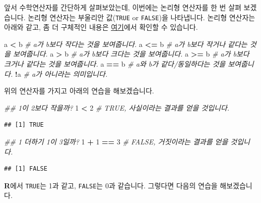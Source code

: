 \documentclass[]{book}
\newenvironment{Shaded}{\begin{snugshade}}{\end{snugshade}}
\newcommand{\CommentTok}[1]{\textcolor[rgb]{0.56,0.35,0.01}{\textit{#1}}}
\newcommand{\DecValTok}[1]{\textcolor[rgb]{0.00,0.00,0.81}{#1}}
\newcommand{\NormalTok}[1]{#1}
\newcommand{\OperatorTok}[1]{\textcolor[rgb]{0.81,0.36,0.00}{\textbf{#1}}}
\newcommand{\StringTok}[1]{\textcolor[rgb]{0.31,0.60,0.02}{#1}}
\begin{document}
앞서 수학연산자를 간단하게 살펴보았는데, 이번에는 논리형 연산자를 한 번 살펴 보겠습니다. 논리형 연산자는 부울리안 값(\texttt{TRUE} or \texttt{FALSE})을 나타냅니다. 논리형 연산자는 아래와 같고, 좀 더 구체적인 내용은 \href{https://www.statmethods.net/management/operators.html}{여기}에서 확인할 수 있습니다.

\begin{Shaded}
\begin{Highlighting}[]
\NormalTok{a }\OperatorTok{<}\StringTok{ }\NormalTok{b   }\CommentTok{# a가 b보다 작다는 것을 보여줍니다.}
\NormalTok{a }\OperatorTok{<=}\StringTok{ }\NormalTok{b  }\CommentTok{# a가 b보다 작거나 같다는 것을 보여줍니다.}
\NormalTok{a }\OperatorTok{>}\StringTok{ }\NormalTok{b   }\CommentTok{# a가 b보다 크다는 것을 보여줍니다.}
\NormalTok{a }\OperatorTok{>=}\StringTok{ }\NormalTok{b  }\CommentTok{# a가 b보다 크거나 같다는 것을 보여줍니다.}
\NormalTok{a }\OperatorTok{==}\StringTok{ }\NormalTok{b  }\CommentTok{# a와 b가 같다/동일하다는 것을 보여줍니다.}
\OperatorTok{!}\NormalTok{a      }\CommentTok{# a가 아니라는 의미입니다.}
\end{Highlighting}
\end{Shaded}

위의 연산자를 가지고 아래의 연습을 해보겠습니다.

\begin{Shaded}
\begin{Highlighting}[]
\CommentTok{## 1이 2보다 작을까?}
\DecValTok{1} \OperatorTok{<}\StringTok{ }\DecValTok{2} \CommentTok{# TRUE, 사실이라는 결과를 얻을 것입니다.}
\end{Highlighting}
\end{Shaded}

\begin{verbatim}
## [1] TRUE
\end{verbatim}

\begin{Shaded}
\begin{Highlighting}[]
\CommentTok{## 1 더하기 1이 3일까?}
\DecValTok{1} \OperatorTok{+}\StringTok{ }\DecValTok{1} \OperatorTok{==}\StringTok{ }\DecValTok{3} \CommentTok{# FALSE, 거짓이라는 결과를 얻을 것입니다.}
\end{Highlighting}
\end{Shaded}

\begin{verbatim}
## [1] FALSE
\end{verbatim}

\textbf{R}에서 \texttt{TRUE}는 1과 같고, \texttt{FALSE}는 0과 같습니다. 그렇다면 다음의 연습을 해보겠습니다.
\end{document}
